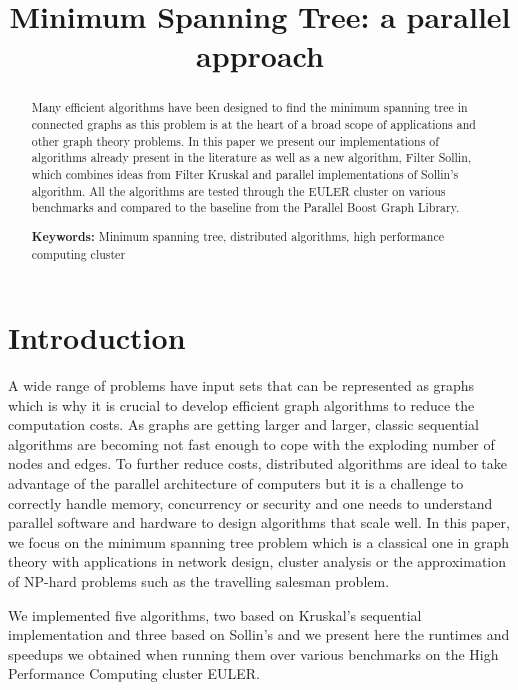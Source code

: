 \documentclass[letterpaper]{article}
\title{Minimum Spanning Tree: a parallel approach}
\begin{document}
%
\maketitle
%


\begin{abstract}

Many efficient algorithms have been designed to find the minimum spanning tree in connected graphs as this problem is at the heart of a broad scope of applications and other graph theory problems. 
In this paper we present our implementations of algorithms already present in the literature as well as a new algorithm, Filter Sollin, which combines ideas from Filter Kruskal and parallel implementations of Sollin's algorithm. All the algorithms are tested through the EULER cluster on various benchmarks and compared to the baseline from the Parallel Boost Graph Library.

\noindent\textbf{Keywords:} Minimum spanning tree, distributed algorithms, high performance computing cluster 


\end{abstract}

\section{Introduction}\label{sec:intro}

A wide range of problems have input sets that can be represented as graphs which is why it is crucial to develop efficient graph algorithms to reduce the computation costs. As graphs are getting larger and larger, classic sequential algorithms are becoming not fast enough to cope with the exploding number of nodes and edges. To further reduce costs, distributed algorithms are ideal to take advantage of the parallel architecture of computers but it is a challenge to correctly handle memory, concurrency or security and one needs to understand parallel software and hardware to design algorithms that scale well.
In this paper, we focus on the minimum spanning tree problem which is a classical one in graph theory with applications in network design, cluster analysis or the approximation of NP-hard problems such as the travelling salesman problem. 

We implemented five algorithms, two based on Kruskal's sequential implementation and three based on Sollin's and we present here the runtimes and speedups we obtained when running them over various benchmarks on the High Performance Computing cluster EULER. 
\end{document}
